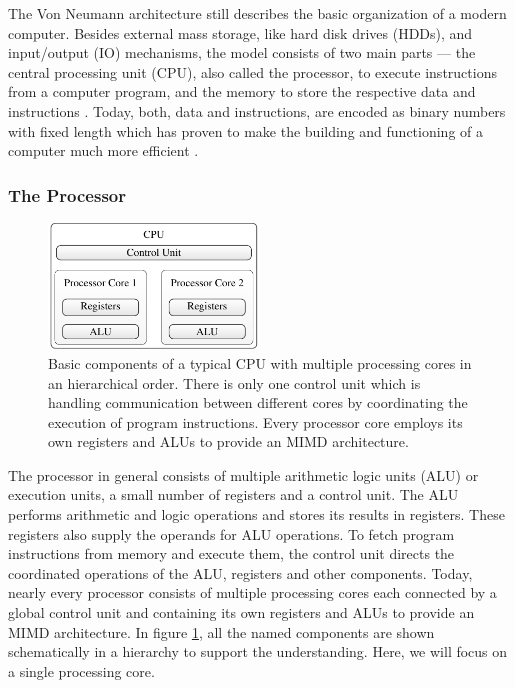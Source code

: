 \documentclass{stdlocal}
\begin{document}
    The Von Neumann architecture still describes the basic organization of a modern computer.
    Besides external mass storage, like hard disk drives (HDDs), and input/output (IO) mechanisms, the model consists of two main parts --- the central processing unit (CPU), also called the processor, to execute instructions from a computer program, and the memory to store the respective data and instructions \autocite{hennessy2019}.
    Today, both, data and instructions, are encoded as binary numbers with fixed length which has proven to make the building and functioning of a computer much more efficient \autocite{patterson2014}.

    \subsubsection*{The Processor}
    \begin{figure}
      \center
      \includegraphics[width=0.5\textwidth]{figures/cpu_components.pdf}
      \caption[Hierarchical Order of CPU Components]{%
        Basic components of a typical CPU with multiple processing cores in an hierarchical order.
        There is only one control unit which is handling communication between different cores by coordinating the execution of program instructions.
        Every processor core employs its own registers and ALUs to provide an MIMD architecture.
      }
      \label{fig:cpu-components}
    \end{figure}
    The processor in general consists of multiple arithmetic logic units (ALU) or execution units, a small number of registers and a control unit.
    The ALU performs arithmetic and logic operations and stores its results in registers.
    These registers also supply the operands for ALU operations.
    To fetch program instructions from memory and execute them, the control unit directs the coordinated operations of the ALU, registers and other components.
    Today, nearly every processor consists of multiple processing cores each connected by a global control unit and containing its own registers and ALUs to provide an MIMD architecture.
    In figure \ref{fig:cpu-components}, all the named components are shown schematically in a hierarchy to support the understanding.
    Here, we will focus on a single processing core.
\end{document}
